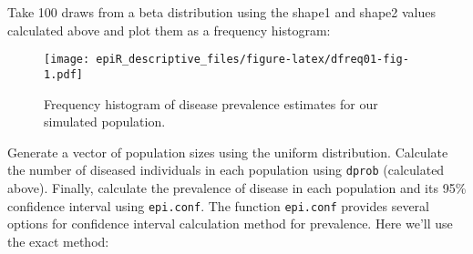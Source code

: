 \documentclass[
]{article}
\newenvironment{Shaded}{\begin{snugshade}}{\end{snugshade}}
\newcommand{\CommentTok}[1]{\textcolor[rgb]{0.56,0.35,0.01}{\textit{#1}}}
\newcommand{\DataTypeTok}[1]{\textcolor[rgb]{0.13,0.29,0.53}{#1}}
\newcommand{\DecValTok}[1]{\textcolor[rgb]{0.00,0.00,0.81}{#1}}
\newcommand{\FloatTok}[1]{\textcolor[rgb]{0.00,0.00,0.81}{#1}}
\newcommand{\KeywordTok}[1]{\textcolor[rgb]{0.13,0.29,0.53}{\textbf{#1}}}
\newcommand{\NormalTok}[1]{#1}
\newcommand{\OperatorTok}[1]{\textcolor[rgb]{0.81,0.36,0.00}{\textbf{#1}}}
\newcommand{\StringTok}[1]{\textcolor[rgb]{0.31,0.60,0.02}{#1}}
\begin{document}
Take 100 draws from a beta distribution using the shape1 and shape2
values calculated above and plot them as a frequency histogram:

\begin{Shaded}
\end{Shaded}

\begin{figure}
\centering
\texttt{[image: epiR\_descriptive\_files/figure-latex/dfreq01-fig-1.pdf]}
\caption{\label{fig:dfreq01}Frequency histogram of disease prevalence
estimates for our simulated population.}
\end{figure}

Generate a vector of population sizes using the uniform distribution.
Calculate the number of diseased individuals in each population using
\texttt{dprob} (calculated above). Finally, calculate the prevalence of
disease in each population and its 95\% confidence interval using
\texttt{epi.conf}. The function \texttt{epi.conf} provides several
options for confidence interval calculation method for prevalence. Here
we'll use the exact method:
\end{document}
